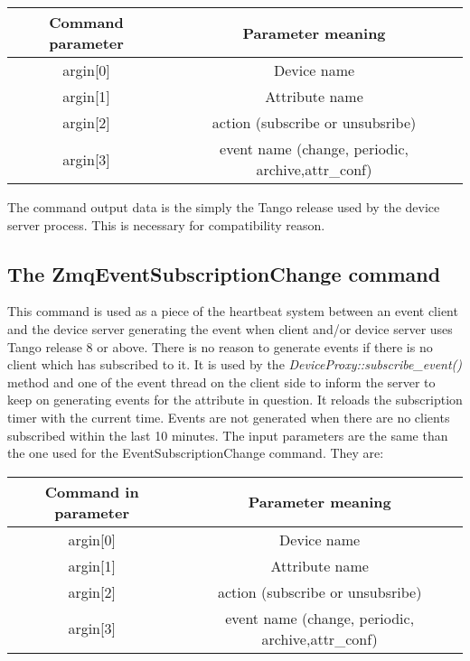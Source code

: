 \vspace{0.3cm}

\begin{center}
\begin{longtable}{|c|c|}
\hline 
Command parameter & Parameter meaning\tabularnewline
\hline 
\hline 
argin{[}0{]} & Device name\tabularnewline
\hline 
argin{[}1{]} & Attribute name\tabularnewline
\hline 
argin{[}2{]} & action (\textquotedbl{}subscribe\textquotedbl{} or \textquotedbl{}unsubsribe\textquotedbl{})\tabularnewline
\hline 
argin{[}3{]} & event name (\textquotedbl{}change\textquotedbl{}, \textquotedbl{}periodic\textquotedbl{},
\textquotedbl{}archive\textquotedbl{},\textquotedbl{}attr\_conf\textquotedbl{})\tabularnewline
\hline 
\end{longtable}
\par\end{center}

\vspace{0.3cm}

The command output data is the simply the Tango release used by the
device server process. This is necessary for compatibility reason.

\subsection{The ZmqEventSubscriptionChange
command }

This command is used as a piece of the \textquotedbl{}heartbeat\textquotedbl{}
system between an event client and the device server generating the
event when client and/or device server uses Tango release 8 or above.
There is no reason to generate events if there is no client which
has subscribed to it. It is used by the \emph{DeviceProxy::subscribe\_event()}
method and one of the event thread on the client side to inform the
server to keep on generating events for the attribute in question.
It reloads the subscription timer with the current time. Events are
not generated when there are no clients subscribed within the last
10 minutes. The input parameters are the same than the one used for
the EventSubscriptionChange command. They are:

\vspace{0.3cm}

\begin{center}
\begin{longtable}{|c|c|}
\hline 
Command in parameter & Parameter meaning\tabularnewline
\hline 
\hline 
argin{[}0{]} & Device name\tabularnewline
\hline 
argin{[}1{]} & Attribute name\tabularnewline
\hline 
argin{[}2{]} & action (\textquotedbl{}subscribe\textquotedbl{} or \textquotedbl{}unsubsribe\textquotedbl{})\tabularnewline
\hline 
argin{[}3{]} & event name (\textquotedbl{}change\textquotedbl{}, \textquotedbl{}periodic\textquotedbl{},
\textquotedbl{}archive\textquotedbl{},\textquotedbl{}attr\_conf\textquotedbl{})\tabularnewline
\hline 
\end{longtable}
\par\end{center}

